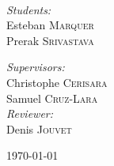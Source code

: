 \begin{titlepage}
\begin{center}
\HRule \\[1.5cm]

\vfill
\begin{minipage}{0.4\textwidth}
\begin{flushleft} \large
\emph{Students:}\\
Esteban \textsc{Marquer}\\
Prerak \textsc{Srivastava}
\end{flushleft}
\end{minipage}
\begin{minipage}{0.4\textwidth}
\begin{flushright} \large
\emph{Supervisors:} \\
Christophe \textsc{Cerisara} \\
Samuel \textsc{Cruz-Lara} \\
\emph{Reviewer:} \\
Denis \textsc{Jouvet}
\end{flushright}
\end{minipage}

\vfill

{\large \today}

\end{center}
\end{titlepage}